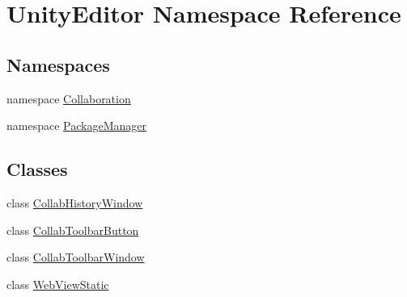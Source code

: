\hypertarget{namespace_unity_editor}{}\section{Unity\+Editor Namespace Reference}
\label{namespace_unity_editor}
\subsection*{Namespaces}
\begin{DoxyCompactItemize}
\item 
namespace \mbox{\hyperlink{namespace_unity_editor_1_1_collaboration}{Collaboration}}
\item 
namespace \mbox{\hyperlink{namespace_unity_editor_1_1_package_manager}{Package\+Manager}}
\end{DoxyCompactItemize}
\subsection*{Classes}
\begin{DoxyCompactItemize}
\item 
class \mbox{\hyperlink{class_unity_editor_1_1_collab_history_window}{Collab\+History\+Window}}
\item 
class \mbox{\hyperlink{class_unity_editor_1_1_collab_toolbar_button}{Collab\+Toolbar\+Button}}
\item 
class \mbox{\hyperlink{class_unity_editor_1_1_collab_toolbar_window}{Collab\+Toolbar\+Window}}
\item 
class \mbox{\hyperlink{class_unity_editor_1_1_web_view_static}{Web\+View\+Static}}
\end{DoxyCompactItemize}
